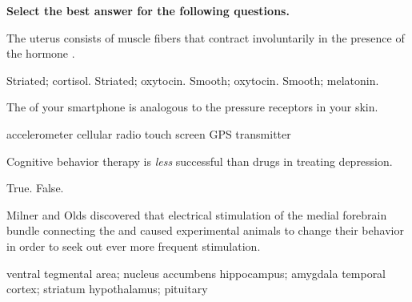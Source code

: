 \documentclass[answers]{exam}
\begin{document}
\begin{questions}
\vspace{.25in}

\textbf{Select the best answer for the following questions.}

\question The uterus consists of \fillin muscle fibers that contract involuntarily in the presence of the hormone \fillin.
\begin{choices}
\choice Striated; cortisol.
\choice Striated; oxytocin.
\correctchoice Smooth; oxytocin.
\choice Smooth; melatonin.
\end{choices}

\newpage


\question The \fillin of your smartphone is analogous to the pressure receptors in your skin.
\begin{choices}
\choice accelerometer
\choice cellular radio
\correctchoice touch screen
\choice GPS transmitter
\end{choices}

\question Cognitive behavior therapy is \emph{less} successful than drugs in treating depression.
\begin{choices}
\choice True.
\correctchoice False.
\end{choices}

\question Milner and Olds discovered that electrical stimulation of the medial forebrain bundle connecting the \fillin and \fillin caused experimental animals to change their behavior in order to seek out ever more frequent stimulation.
\begin{choices}
\correctchoice ventral tegmental area; nucleus accumbens
\choice hippocampus; amygdala
\choice temporal cortex; striatum
\choice hypothalamus; pituitary
\end{choices}



\end{questions}
\end{document}
